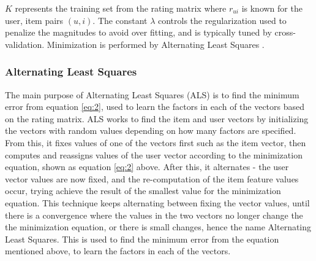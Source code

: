 \begin{math} K \end{math} represents the training set from the rating matrix where \begin{math} r_{ui} \end{math} is known for the user, item pairs \begin{math} (u,i) \end{math}. The constant \begin{math}\lambda\end{math} controls the regularization used to penalize the magnitudes to avoid over fitting, and is typically tuned by cross-validation. Minimization is performed by Alternating Least Squares \cite{koren2011}. 



\subsubsection{Alternating Least Squares}

The main purpose of Alternating Least Squares (ALS) is to find the minimum error from equation \ref{eq:2}, used to learn the factors in each of the vectors based on the rating matrix. ALS works to find the item and user vectors by initializing the vectors with random values depending on how many factors are specified. From this, it fixes values of one of the vectors first such as the item vector, then computes and reassigns values of the user vector according to the minimization equation, shown as equation \ref{eq:2} above. After this, it alternates - the user vector values are now fixed, and the re-computation of the item feature values occur, trying achieve the result of the smallest value for the minimization equation. This technique keeps alternating between fixing the vector values, until there is a convergence where the values in the two vectors no longer change the the minimization equation, or there is small changes, hence the name Alternating Least Squares. This is used to find the minimum error from the equation mentioned above, to learn the factors in each of the vectors. 

